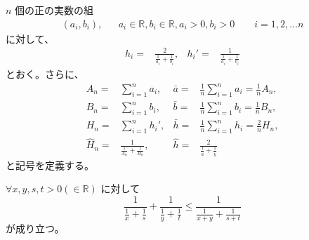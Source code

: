 \documentclass[12pt]{jsarticle}
\def\arithmean#1{\bar{#1}}
\def\arithsum#1{#1}
\def\harmmean#1{\hat{#1}}
\def\harmformula#1#2#3{\frac{#1}{\frac{1}{#2} + \frac{1}{#3}}}
\begin{document}
\begin{definition}[記号]
$n$ 個の正の実数の組
\begin{align}
(a_i, b_i), && a_i \in \mathbb{R}, b_i \in \mathbb{R},
a_i > 0, b_i >0 \qquad i = 1, 2, \ldots n
\end{align}
に対して、
\begin{align}
h_i = & \harmformula{2}{a_i}{b_i},
& {h_i}' = & \harmformula{1}{a_i}{b_i}
\end{align}
とおく。さらに、
\begin{align}
\arithsum{A_n} = & \sum_{i=1}^{n} a_i,
& \arithmean{a} = &
\frac{1}{n} \sum_{i=1}^{n} a_i
= \frac{1}{n} A_n, \\
\arithsum{B_n} = & \sum_{i=1}^{n} b_i,
& \arithmean{b} = &
\frac{1}{n} \sum_{i=1}^{n} b_i
= \frac{1}{n} B_n, \\
\arithsum{H_n} = & \sum_{i=1}^{n} {h_i}',
& \arithmean{h} = &
\frac{1}{n} \sum_{i=1}^{n} h_i
= \frac{2}{n} H_n, \\
\harmmean{H}_{n} = & \harmformula{1}{A_n}{B_n},
& \harmmean{h} = & \harmformula{2}{\arithmean{a}}{\arithmean{b}}
\end{align}
と記号を定義する。
\end{definition}

\begin{lemma}\label{lem:harmonic}
$\forall x, y, s, t > 0 (\in \mathbb{R})$ に対して
\begin{equation}
\harmformula{1}{x}{s} + \harmformula{1}{y}{t}
\le \harmformula{1}{x + y}{s + t}
\end{equation}
が成り立つ。
\end{lemma}
\end{document}
